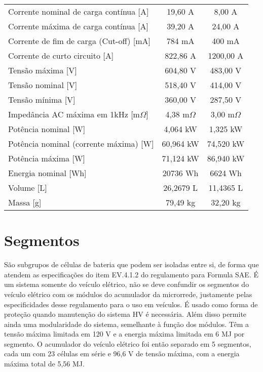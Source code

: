 \begin{table}[!htp]
\begin{tabular}{lcc}
            Corrente nominal de carga contínua [A]          & 19,60 A       & 8,00 A            \\
            Corrente máxima de carga contínua [A]           & 39,20 A       & 24,00 A           \\
            Corrente de fim de carga (Cut-off) [mA]         & 784 mA        & 400 mA            \\
            Corrente de curto circuito [A]                  & 822,86 A      & 1200,00 A         \\
            Tensão máxima [V]                               & 604,80 V      & 483,00 V          \\
            Tensão nominal [V]                              & 518,40 V      & 414,00 V          \\
            Tensão mínima [V]                               & 360,00 V      & 287,50 V          \\
            Impedância AC máxima em 1kHz [m$\Omega$]        & 4,38 m$\Omega$& 3,00 m$\Omega$    \\
            Potência nominal [W]                            & 4,064 kW      & 1,325 kW          \\
            Potência nominal (corrente máxima) [W]          & 60,964 kW     & 74,520 kW         \\
            Potência máxima [W]                             & 71,124 kW     & 86,940 kW         \\
            Energia nominal [Wh]                            & 20736 Wh      & 6624 Wh           \\
            Volume [L]                                      & 26,2679 L     & 11,4365 L         \\
            Massa [g]                                       & 79,49 kg      & 32,20 kg          \\
            \hline
        \end{tabular}
    \end{table}


\section{Segmentos}

    São subgrupos de células de bateria que podem ser isoladas entre si, de forma que atendem as especificações do item EV.4.1.2 do regulamento para Formula SAE. É um sistema somente do veículo elétrico, não se deve confundir os segmentos do veículo elétrico com os módulos do acumulador da microrrede, justamente pelas especificidades desse regulamento para o uso em veículos. É usado como forma de proteção quando manutenção do sistema HV é necessária. Além disso permite ainda uma modularidade do sistema, semelhante à função dos módulos. Têm a tensão máxima limitada em 120 V e a energia máxima limitada em 6 MJ por segmento. O acumulador do veículo elétrico foi então separado em 5 segmentos, cada um com 23 células em série e 96,6 V de tensão máxima, com a energia máxima total de 5,56 MJ. 
    
